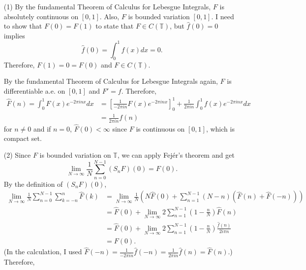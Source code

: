 \documentclass{article}
\begin{document}
\begin{enumerate}
\item[(1)] By the fundamental Theorem of Calculus for Lebesgue Integrals, $F$ is absolutely continuous on $[0, 1]$. Also, $F$ is bounded variation $[0,1]$. I need to show that $F(0)=F(1)$ to state that $F\in C(\mathbb{T})$, but $\hat{f}(0)=0$ implies
\begin{equation*}
\hat{f}(0)=\int_0^1 f(x)dx=0.
\end{equation*}
Therefore, $F(1)=0=F(0)$ and $F\in C(\mathbb{T})$.

By the fundamental Theorem of Calculus for Lebesgue Integrals again, $F$ is differentiable a.e. on $[0,1]$ and $F'=f$. Therefore,
\begin{equation*}
\begin{split}
\hat{F}(n)=\int_0^1 F(x)e^{-2\pi i n x} dx&=\left[\frac{1}{-2\pi i n} F(x)e^{-2\pi i n x}\right]_0^1 + \frac{1}{2\pi i n}\int_0^1 f(x)e^{-2\pi i n x} dx \\
&=\frac{1}{2\pi i n}f(n)
\end{split}
\end{equation*}
for $n\neq 0$ and if $n=0$, $\hat{F}(0)<\infty$ since $F$ is continuous on $[0,1]$, which is compact set.
\item[(2)] Since $F$ is bounded variation on $\mathbb{T}$, we can apply Fej\'er's theorem and get
\begin{equation*}
\lim\limits_{N\rightarrow\infty}\frac{1}{N}\sum\limits_{n=0}^{N-1}(S_n F)(0)=F(0).
\end{equation*}
By the definition of $(S_n F)(0)$,
\begin{equation*}
\begin{split}
\lim\limits_{N\rightarrow\infty}\frac{1}{N}\sum\limits_{n=0}^{N-1}\sum\limits_{k=-n}^n \hat{F}(k)&=\lim\limits_{N\rightarrow\infty}\frac{1}{N}\left(N\hat{F}(0)+\sum\limits_{n=1}^{N-1}(N-n)(\hat{F}(n)+\hat{F}(-n))\right) \\
&=\hat{F}(0)+\lim\limits_{N\rightarrow\infty}2\sum\limits_{n=1}^{N-1}\left(1-\frac{n}{N}\right)\hat{F}(n) \\
&=\hat{F}(0)+\lim\limits_{N\rightarrow\infty}2\sum\limits_{n=1}^{N-1}\left(1-\frac{n}{N}\right)\frac{\hat{f}(n)}{2i\pi n} \\
&=F(0).
\end{split}
\end{equation*}
(In the calculation, I used $\hat{F}(-n)=\frac{1}{-2\pi i n}\hat{f}(-n)=\frac{1}{2\pi i n}\hat{f}(n)=\hat{F}(n)$.) Therefore,
\begin{equation*}

\end{equation*}
\end{enumerate}
\end{document}
